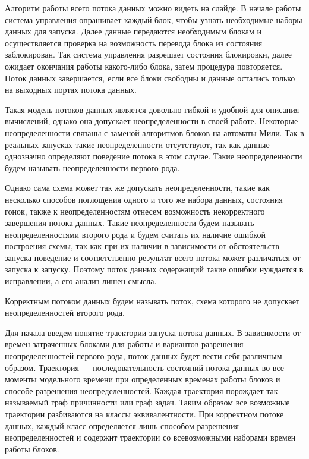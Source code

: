 \documentclass[10pt,a4paper,onecolumn]{report}
\begin{document}
  Алгоритм работы всего потока данных можно видеть на слайде.
  В начале работы система управления опрашивает каждый блок, чтобы узнать необходимые наборы данных для запуска.
  Далее данные передаются необходимым блокам и осуществляется проверка на возможность перевода блока из состояния заблокирован.
  Так система управления разрешает состояния блокировки, далее ожидает окончания работы какого-либо блока, затем процедура повторяется.
  Поток данных завершается, если все блоки свободны и данные остались только на выходных портах потока данных.
  
  Такая модель потоков данных является довольно гибкой и удобной для описания вычислений, однако она допускает неопределенности в своей работе.
  Некоторые неопределенности связаны с заменой алгоритмов блоков на автоматы Мили. Так в реальных запусках такие неопределенности отсутствуют, так
  как данные однозначно определяют поведение потока в этом случае. Такие неопределенности будем называть неопределенности первого рода.
  
  Однако сама схема может так же допускать неопределенности, такие как несколько способов поглощения одного и того же набора данных,
  состояния гонок, также к неопределенностям отнесем возможность некорректного завершения потока данных. Такие неопределенности будем называть
  неопределенностями второго рода и будем считать их наличие ошибкой построения схемы, так как при их наличии в зависимости от обстоятельств запуска поведение и соответственно результат
  всего потока может различаться от запуска к запуску. Поэтому поток данных содержащий такие ошибки нуждается в исправлении, а его анализ лишен смысла.
  
  Корректным потоком данных будем называть поток, схема которого не допускает неопределенностей второго рода.
  
  Для начала введем понятие траектории запуска потока данных. В зависимости от времен затраченных блоками для работы и вариантов разрешения неопределенностей первого рода,
  поток данных будет вести себя различным образом. Траектория --- последовательность состояний потока данных во все моменты модельного времени при определенных
  временах работы блоков и способе разрешения неопределенностей. Каждая траектория порождает так называемый граф причинности или граф задач.
  Таким образом все возможные траектории разбиваются на классы эквивалентности. При корректном потоке данных, каждый класс определяется лишь способом
  разрешения неопределенностей и содержит траектории со всевозможными наборами времен работы блоков.
  
\end{document}
